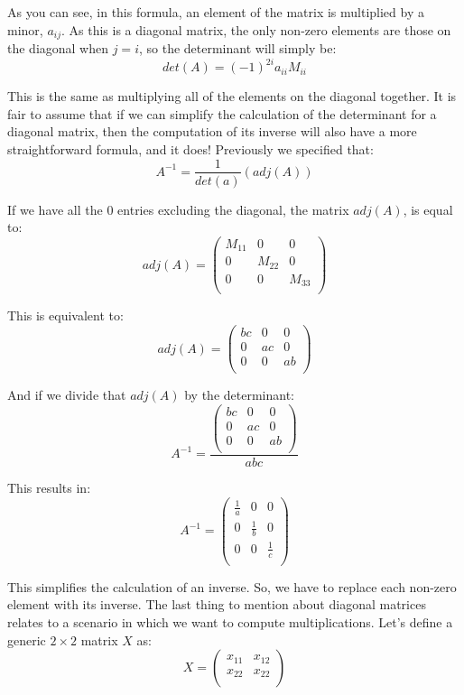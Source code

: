 \documentclass[a4,12pt,twosided,openany]{memoir}
\begin{document}
As you can see, in this formula, an element of the matrix is multiplied by a minor, $a_{ij}$. As this is a diagonal matrix, the only non-zero elements are those on the diagonal when $j=i$, so the determinant will simply be:
\[det(A) =(-1)^{2i}a_{ii}M_{ii}\]
\par 
\indent
This is the same as multiplying all of the elements on the diagonal together. It is fair to assume that if we can simplify the calculation of the determinant for a diagonal matrix, then the computation of its inverse will also have a more straightforward formula, and it does! Previously we specified that:
\[A^{-1} = \frac{1}{det(a)}(adj(A))\]
\par 
\indent
If we have all the 0 entries excluding  the diagonal, the matrix $adj(A)$, is equal to:
 \[adj(A) = \begin{pmatrix}
M_{11} & 0 & 0 \\
0 & M_{22} & 0 \\
0 & 0 & M_{33} \\
\end{pmatrix} \]
\par 
\indent
This is equivalent to:
\[adj(A) = \begin{pmatrix}
bc & 0 & 0 \\
0 & ac & 0 \\
0 & 0 & ab \\
\end{pmatrix} \]
\par 
\indent
And if we divide that $adj(A)$ by the determinant:
\[A^{-1} = \frac{\begin{pmatrix}
bc & 0 & 0 \\
0 & ac & 0 \\
0 & 0 & ab \\
\end{pmatrix}}{abc} \]
\par 
\indent
This results in:
\[A^{-1} = \begin{pmatrix}
\frac{1}{a} & 0 & 0 \\
0 & \frac{1}{b} & 0 \\
0 & 0 & \frac{1}{c} \\
\end{pmatrix} \]
\par 
\indent
This simplifies the calculation of an inverse. So, we have to replace each non-zero element with its inverse. The last thing to mention about diagonal matrices relates to a scenario in which we want to compute multiplications. Let’s define a generic $2 \times 2$ matrix $X$ as:
\[X = \begin{pmatrix}
x_{11} & x_{12}  \\
x_{22} & x_{22}  \\
\end{pmatrix}
\]
\end{document}
